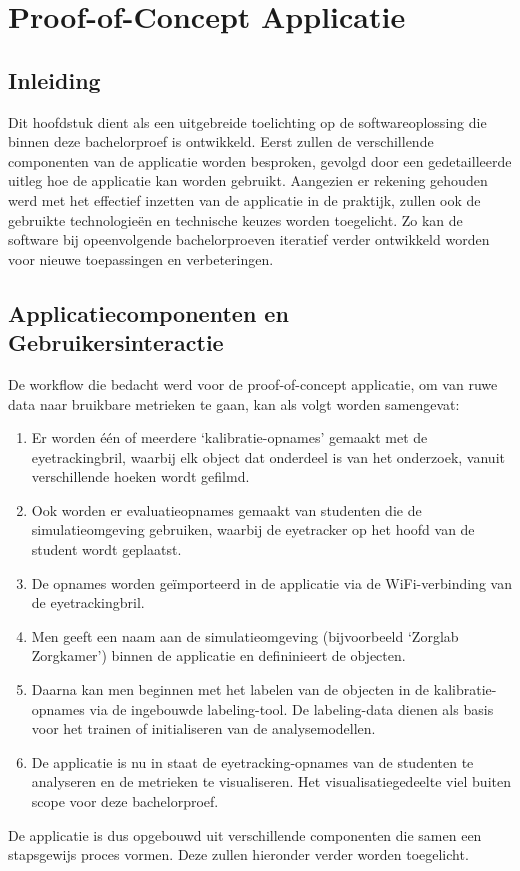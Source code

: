\chapter{Proof-of-Concept Applicatie}
\label{ch:ontwikkeling}

\section{Inleiding}

Dit hoofdstuk dient als een uitgebreide toelichting op de softwareoplossing die binnen deze bachelorproef is ontwikkeld.
Eerst zullen de verschillende componenten van de applicatie worden besproken, gevolgd door een gedetailleerde uitleg hoe de applicatie kan worden gebruikt.
Aangezien er rekening gehouden werd met het effectief inzetten van de applicatie in de praktijk, zullen ook de gebruikte technologieën en technische keuzes worden toegelicht.
Zo kan de software bij opeenvolgende bachelorproeven iteratief verder ontwikkeld worden voor nieuwe toepassingen en verbeteringen.

\section{Applicatiecomponenten en Gebruikersinteractie}

De workflow die bedacht werd voor de proof-of-concept applicatie, om van ruwe data naar bruikbare metrieken te gaan, kan als volgt worden samengevat:
\begin{enumerate}
    \item Er worden één of meerdere `kalibratie-opnames' gemaakt met de eyetrackingbril, waarbij elk object dat onderdeel is van het onderzoek, vanuit verschillende hoeken wordt gefilmd.
    \item Ook worden er evaluatieopnames gemaakt van studenten die de simulatieomgeving gebruiken, waarbij de eyetracker op het hoofd van de student wordt geplaatst.
    \item De opnames worden geïmporteerd in de applicatie via de WiFi-verbinding van de eyetrackingbril.
    \item Men geeft een naam aan de simulatieomgeving (bijvoorbeeld `Zorglab Zorgkamer') binnen de applicatie en defininieert de objecten.
    \item Daarna kan men beginnen met het labelen van de objecten in de kalibratie-opnames via de ingebouwde labeling-tool. De labeling-data dienen als basis voor het trainen of initialiseren van de analysemodellen.
    \item De applicatie is nu in staat de eyetracking-opnames van de studenten te analyseren en de metrieken te visualiseren. 
    Het visualisatiegedeelte viel buiten scope voor deze bachelorproef.
\end{enumerate}
De applicatie is dus opgebouwd uit verschillende componenten die samen een stapsgewijs proces vormen. Deze zullen hieronder verder worden toegelicht.

